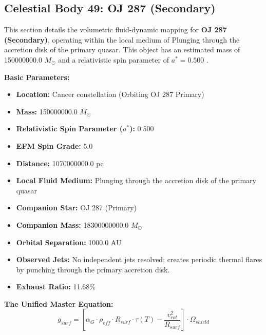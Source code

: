 \documentclass[11pt, a4paper]{article}
\begin{document}
\clearpage
\subsection{Celestial Body 49: OJ 287 (Secondary)}
This section details the volumetric fluid-dynamic mapping for \textbf{OJ 287 (Secondary)}, operating within the local medium of Plunging through the accretion disk of the primary quasar. This object has an estimated mass of 150000000.0 $M_{\odot}$ and a relativistic spin parameter of $a^* = 0.500$ \cite{valtonen2008, ned}.

\vspace{0.5em}
\noindent \textbf{Basic Parameters:}
\begin{itemize}
  \item \textbf{Location:} Cancer constellation (Orbiting OJ 287 Primary)
  \item \textbf{Mass:} 150000000.0 $M_{\odot}$
  \item \textbf{Relativistic Spin Parameter ($a^*$):} 0.500
  \item \textbf{EFM Spin Grade:} 5.0
  \item \textbf{Distance:} 1070000000.0 pc
  \item \textbf{Local Fluid Medium:} Plunging through the accretion disk of the primary quasar
  \item \textbf{Companion Star:} OJ 287 (Primary)
  \item \textbf{Companion Mass:} 18300000000.0 $M_{\odot}$
  \item \textbf{Orbital Separation:} 1000.0 AU
  \item \textbf{Observed Jets:} No independent jets resolved; creates periodic thermal flares by punching through the primary accretion disk.
  \item \textbf{Exhaust Ratio:} 11.68\%
\end{itemize}

\vspace{0.5em}
\noindent \textbf{The Unified Master Equation:}
$$ g_{surf} = \left[ \alpha_G \cdot \rho_{eff} \cdot R_{surf} \cdot \tau(T) - \frac{v_{rot}^2}{R_{surf}} \right] \cdot \Omega_{shield} $$
\end{document}
